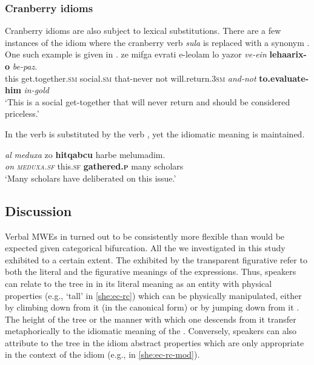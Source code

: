 \documentclass[output=paper]{langsci/langscibook}
\begin{document}
\subsubsection{Cranberry idioms}
Cranberry idioms are also subject to lexical substitutions. There are a few instances of the idiom  where the cranberry verb \textit{sula} is replaced with a  synonym . One such example is given in .
	\ea\label{she:yesula-sub}
    	\gll ze mifga{\shin} {\het}evrati {\shin}e-le{\ayin}olam lo ya{\het}zor \textit{ve-{\alef}ein} \textbf{leha{\ayinB}arix-o} \textit{be-paz}.\\
    	   this get.together.\textsc{sm} social.\textsc{sm} that-never not will.return.\textsc{3sm} \textit{and-not} \textbf{to.evaluate-him} \textit{in-gold}\\
    	\glt `This is a social get-together that will never return and should be considered priceless.'
	\z

In  the verb  is substituted by the verb , yet the idiomatic meaning is maintained.

    \ea\label{she:meduxa-sub}
         \gll \textit{{\ayin}al} \textit{meduxa} zo \textbf{hitqabcu} harbe melumadim.\\
             \textit{on} \textit{\textsc{meduxa}.\textsc{sf}} this.\textsc{sf}  \textbf{gathered.\textsc{p}} many scholars\\
        \glt `Many scholars have deliberated on this issue.'
    \z


\subsection{Discussion}

Verbal MWEs in  turned out to be consistently more flexible than would be expected given  categorical bifurcation. All the  we investigated in this study exhibited  to a certain extent. The  exhibited by the transparent figurative  refer to both the literal and the figurative meanings of the expressions. Thus, speakers can relate to the tree in  in its literal meaning as an entity with physical properties (e.g., `tall' in \ref{she:ec-rc}) which can be physically manipulated, either by climbing down from it (in the canonical form) or by jumping down from it . The height of the tree or the manner with which one descends  from it transfer metaphorically to the idiomatic meaning of the . Conversely, speakers can also attribute to the tree in the idiom abstract properties which are only appropriate in the context of the idiom (e.g.,  in \ref{she:ec-rc-mod}).
\end{document}
